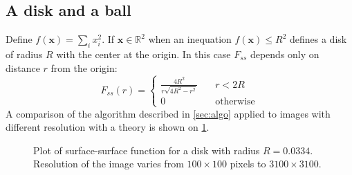 \documentclass[reprint,amsmath,amssymb,aps,pre,showkeys,showpacs]{revtex4-1}
\begin{document}
\subsection{A disk and a ball}
Define $f(\bm{x}) = \sum_i x_i^2$. If $\bm{x} \in \mathbb{R}^2$ when an
inequation $f(\bm{x}) \le R^2$ defines a disk of radius $R$ with the center at
the origin. In this case $F_{ss}$ depends only on distance $r$ from the origin:
\begin{equation*}
  F_{ss}(r) = \left\{
  \begin{array}{ll}
    \frac{4R^2}{r\sqrt{4R^2-r^2}} & \quad r < 2R \\
    0 & \quad \text{otherwise}
  \end{array}
  \right.
\end{equation*}
A comparison of the algorithm described in \cref{sec:algo} applied to images
with different resolution with a theory is shown on \cref{fig:fss-disk}.
\begin{figure}[!hpt]
  \centering
  \hfill
  \caption[]{Plot of surface-surface function for a disk with radius
    $R = 0.0334$. Resolution of the image varies from $100\times 100$ pixels to
    $3100\times 3100$.}
  \label{fig:fss-disk}
\end{figure}
\end{document}
